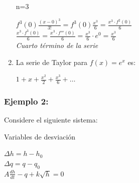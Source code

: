 \documentclass[a4paper,12pt,twoside]{proyectotanquesecci}
\begin{document}
\begin{enumerate}
	n=3
	\begin{center}
		$f^{3}\left( 0\right) \frac {\left( x-0\right) ^{3}}{3!}=f^{3}\left( 0\right) \frac {x^{3}}{6}=\frac {x^{3}\cdot f^{2}\left( 0\right) }{6}$\\
		$\frac {x^{3}\cdot f^{3}\left( 0\right) }{6}=\frac {x^{3}\cdot f'''\left( 0\right) }{6}=\frac {x^{3}}{6}\cdot e^{0}=\frac {x^{3}}{6}$\\
		\textit{ Cuarto término de la serie }\\
	\end{center}
	
\item La serie de Taylor para $f(x)=e^{x}$ es:
	\begin{center} $1+x+\frac {x^{2}}{2}+\frac {x^{3}}{6}+\ldots$ \end{center}
\end{enumerate}

\subsubsection{Ejemplo 2:}

Considere el siguiente sistema:

Variables de desviación

\begin{center}
	$\Delta h=h-h_{0}$\\
	$\Delta q=q-q_{0}$\\
	$A\frac {dh}{dt}-q+k\sqrt {h}=0$\\
\end{center}

\newpage










\end{document}
